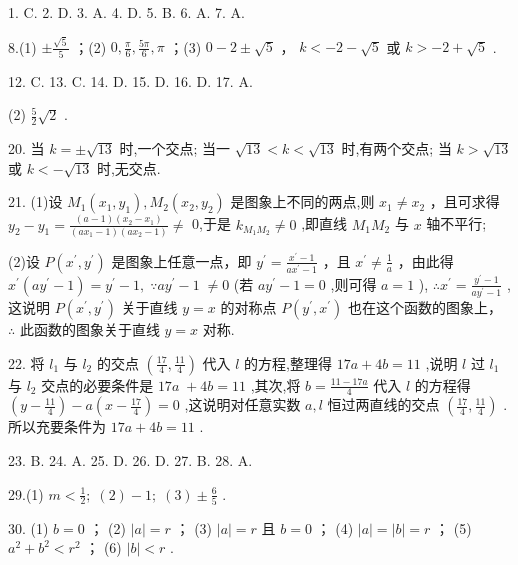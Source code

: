 \documentclass[10pt]{article}
\newcommand*\circled[1]{\tikz[baseline=(char.base)]{\node[shape=circle,draw,inner sep=1.5pt] (char) {\small #1};}}
\begin{document}
1. C. 2. D. 3. A. 4. D. 5. B. 6. A. 7. A.

8.(1) \(\pm  \frac{\sqrt{5}}{5}\) ；(2) \(0,\frac{\pi }{6},\frac{5\pi }{6},\pi\) ；(3) \(0 - 2 \pm  \sqrt{5}\) ， \circled{2}  \(k <  - 2 - \sqrt{5}\) 或 \(k >  - 2 + \sqrt{5}\) .

12. C. 13. C. 14. D. 15. D. 16. D. 17. A.

(2) \(\frac{5}{2}\sqrt{2}\) .

20. 当 \(k =  \pm  \sqrt{13}\) 时,一个交点; 当一 \(\sqrt{13} < k < \sqrt{13}\) 时,有两个交点; 当 \(k > \sqrt{13}\) 或 \(k <  - \sqrt{13}\) 时,无交点.

21. (1)设 \({M}_{1}\left( {{x}_{1},{y}_{1}}\right) ,{M}_{2}\left( {{x}_{2},{y}_{2}}\right)\) 是图象上不同的两点,则 \({x}_{1} \neq  {x}_{2}\) ，且可求得 \({y}_{2} - {y}_{1} = \frac{\left( {a - 1}\right) \left( {{x}_{2} - {x}_{1}}\right) }{\left( {a{x}_{1} - 1}\right) \left( {a{x}_{2} - 1}\right) } \neq\) 0,于是 \({k}_{{M}_{1}{M}_{2}} \neq  0\) ,即直线 \({M}_{1}{M}_{2}\) 与 \(x\) 轴不平行;

(2)设 \(P\left( {{x}^{\prime },{y}^{\prime }}\right)\) 是图象上任意一点，即 \({y}^{\prime } = \frac{{x}^{\prime } - 1}{a{x}^{\prime } - 1}\) ，且 \({x}^{\prime } \neq  \frac{1}{a}\) ，由此得 \({x}^{\prime }\left( {a{y}^{\prime } - 1}\right)  = {y}^{\prime } - 1,\;\because a{y}^{\prime } - 1 \; \neq  0\) (若 \(a{y}^{\prime } - 1 = 0\) ,则可得 \(a = 1\) ), \(\therefore {x}^{\prime } = \frac{{y}^{\prime } - 1}{a{y}^{\prime } - 1}\) ,这说明 \(P\left( {{x}^{\prime },{y}^{\prime }}\right)\) 关于直线 \(y = x\) 的对称点 \(P\left( {{y}^{\prime },{x}^{\prime }}\right)\) 也在这个函数的图象上， \(\therefore\) 此函数的图象关于直线 \(y = x\) 对称.

22. 将 \({l}_{1}\) 与 \({l}_{2}\) 的交点 \(\left( {\frac{17}{4},\frac{11}{4}}\right)\) 代入 \(l\) 的方程,整理得 \({17a} + {4b} = {11}\) ,说明 \(l\) 过 \({l}_{1}\) 与 \({l}_{2}\) 交点的必要条件是 \({17a} \; + {4b} = {11}\) ,其次,将 \(b = \frac{{11} - {17a}}{4}\) 代入 \(l\) 的方程得 \(\left( {y - \frac{11}{4}}\right)  - a\left( {x - \frac{17}{4}}\right)  = 0\) ,这说明对任意实数 \(a,l\) 恒过两直线的交点 \(\left( {\frac{17}{4},\frac{11}{4}}\right)\) . 所以充要条件为 \({17a} + {4b} = {11}\) .

23. B. 24. A. 25. D. 26. D. 27. B. 28. A.

29.(1) \(m < \frac{1}{2};\;\left( 2\right)  - 1;\;\left( 3\right)  \pm  \frac{6}{5}\) .

30. (1) \(b = 0\) ； (2) \(\left| a\right|  = r\) ； (3) \(\left| a\right|  = r\) 且 \(b = 0\) ； (4) \(\left| a\right|  = \left| b\right|  = r\) ； (5) \({a}^{2} + {b}^{2} < {r}^{2}\) ； (6) \(\left| b\right|  < r\) .
\end{document}
